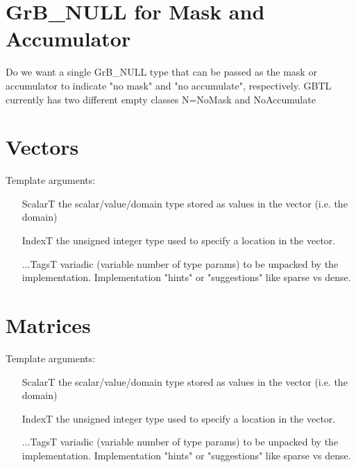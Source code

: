 \section{{\sf GrB\_NULL} for Mask and Accumulator}
\label{Sec:NoMaskNoAccum}

Do we want a single {\sf GrB\_NULL} type that can be passed as the mask or accumulator 
to indicate "no mask" and "no accumulate", respectively.  GBTL currently has two
different empty classes N={\sf NoMask} and {\sf NoAccumulate}

\section{Vectors}
\label{Sec:Vectors}

Template arguments:
\begin{itemize}[leftmargin=1.1in]
\item[ScalarT]  the scalar/value/domain type stored as values in the vector (i.e. the domain)
\item[IndexT]   the unsigned integer type used to specify a location in the vector.
\item[...TagsT] variadic (variable number of type params) to be unpacked by the implementation.
Implementation "hints" or "suggestions" like sparse vs dense.
\end{itemize}

\section{Matrices}
\label{Sec:Matrices}


Template arguments:
\begin{itemize}[leftmargin=1.1in]
\item[ScalarT]  the scalar/value/domain type stored as values in the vector (i.e. the domain)
\item[IndexT]   the unsigned integer type used to specify a location in the vector.
\item[...TagsT] variadic (variable number of type params) to be unpacked by the implementation.
Implementation "hints" or "suggestions" like sparse vs dense.
\end{itemize}

